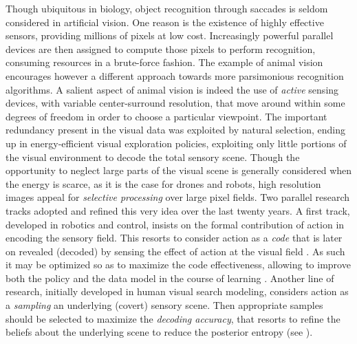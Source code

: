 \documentclass{article}
\begin{document}
Though ubiquitous in biology, object recognition through saccades is seldom considered in artificial vision. One reason is the existence of highly effective sensors, providing millions of pixels at low cost. Increasingly powerful parallel devices are then assigned to compute those pixels to perform recognition, consuming resources in a brute-force fashion. 
The example of animal vision encourages however a different approach towards more parsimonious recognition algorithms. A salient aspect of animal vision is indeed the use of \emph{active} sensing devices, with variable center-surround resolution, that move around within some degrees of freedom in order to choose a particular viewpoint. The important redundancy present in the visual data was exploited by natural selection,  ending up in energy-efficient visual exploration policies, exploiting only little portions of the visual environment to decode the total sensory scene.
Though the opportunity to neglect large parts of the visual scene is generally considered when the energy is scarce, as it is the case for drones and robots, 
high resolution images appeal for \emph{selective processing} over large pixel fields. 
Two parallel research tracks adopted and refined this very idea over the last twenty years. A first track, developed in robotics and control, insists on the formal contribution of action in encoding the sensory field. This resorts to consider action as a \emph{code} that is later on revealed (decoded) by sensing the effect of action at the visual field \citep{klyubin2005empowerment,tishby2011information}. As such it may be optimized so as to maximize the code effectiveness, allowing to improve both the policy and the data model in the course of learning \citep{schmidhuber2007simple,mohamed2015variational,houthooft2016vime}. Another line of research, initially developed in human visual search modeling, considers action as a \emph{sampling} an underlying (covert) sensory scene. Then appropriate samples should be selected to maximize the \emph{decoding accuracy}, that resorts to refine the beliefs about the underlying scene to reduce the posterior entropy (see \cite{najemnik2005optimal,najemnik2009simple,butko2010infomax,friston2012perceptions}).
\end{document}

